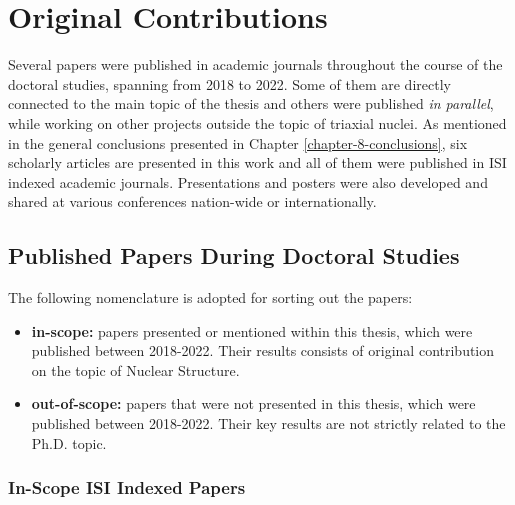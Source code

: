 \chapter{Original Contributions}
\label{appendix:contributions}

Several papers were published in academic journals throughout the course of the doctoral studies, spanning from 2018 to 2022. Some of them are directly connected to the main topic of the thesis and others were published \emph{in parallel}, while working on other projects outside the topic of triaxial nuclei. As mentioned in the general conclusions presented in Chapter \ref{chapter-8-conclusions}, six scholarly articles are presented in this work and all of them were published in ISI indexed academic journals. Presentations and posters were also developed and shared at various conferences nation-wide or internationally. 

\section{Published Papers During Doctoral Studies}

The following nomenclature is adopted for sorting out the papers:
\begin{itemize}
    \item \textbf{in-scope:} papers presented or mentioned within this thesis, which were published between 2018-2022. Their results consists of original contribution on the topic of Nuclear Structure. 
    \item \textbf{out-of-scope:} papers that were not presented in this thesis, which were published between 2018-2022. Their key results are not strictly related to the Ph.D. topic.
\end{itemize}

\subsection{In-Scope ISI Indexed Papers}

